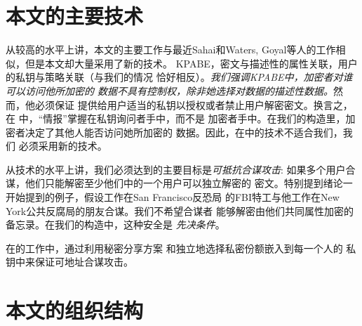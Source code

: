 \section{本文的主要技术}
从较高的水平上讲，本文的主要工作与最近Sahai和Waters\cite{SW:FuzzyIBE},
Goyal等人\cite{GPSW:ABE}的工作相似，但是本文却大量采用了新的技术。
KPABE，密文与描述性的属性关联，用户的私钥与策略关联（与我们的情况
恰好相反）。\textit{我们强调KPABE中，加密者对谁可以访问他所加密的
数据不具有控制权，除非她选择对数据的描述性数据。}然而，他必须保证
提供给用户适当的私钥以授权或者禁止用户解密密文。换言之，在
\cite{SW:FuzzyIBE,GPSW:ABE}中，“情报”掌握在私钥询问者手中，而不是
加密者手中。在我们的构造里，加密者决定了其他人能否访问她所加密的
数据。因此，在\cite{SW:FuzzyIBE,GPSW:ABE}中的技术不适合我们，我们
必须采用新的技术。\par
从技术的水平上讲，我们必须达到的主要目标是\textit{可抵抗合谋攻击}:
如果多个用户合谋，他们只能解密至少他们中的一个用户可以独立解密的
密文。特别提到绪论一开始提到的例子，假设工作在San Francisco反恐局
的FBI特工与他工作在New York公共反腐局的朋友合谋。我们不希望合谋者
能够解密由他们共同属性加密的备忘录。在我们的构造中，这种安全是
\textit{先决条件}。\par
在\cite{SW:FuzzyIBE,GPSW:ABE}的工作中，通过利用秘密分享方案
\cite{Shamir:SSS,Blakley:SSS}和独立地选择私密份额嵌入到每一个人的
私钥中来保证可地址合谋攻击。
\section{本文的组织结构}

